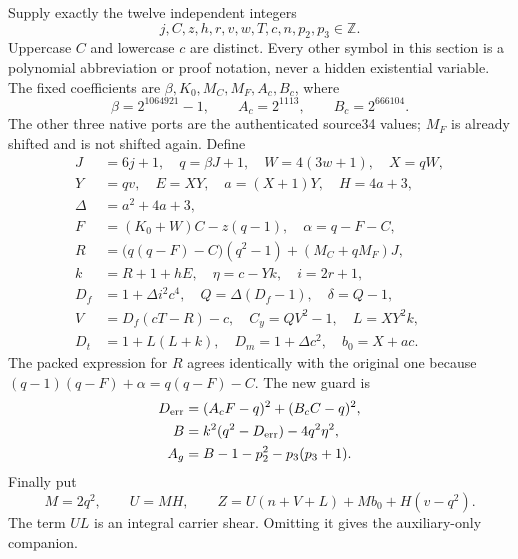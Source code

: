 Supply exactly the twelve independent integers
\[
 j,C,z,h,r,v,w,T,c,n,p_2,p_3\in\mathbb Z.
\]
Uppercase $C$ and lowercase $c$ are distinct.  Every other symbol in this
section is a polynomial abbreviation or proof notation, never a hidden
existential variable.  The fixed coefficients are
$\beta,K_0,M_C,M_F,A_c,B_c$, where
\[
 \beta=2^{1064921}-1,\qquad A_c=2^{1113},\qquad B_c=2^{666104}.
\]
The other three native ports are the authenticated source34 values;
$M_F$ is already shifted and is not shifted again.  Define
\begin{align*}
 J&=6j+1,\quad q=\beta J+1,\quad W=4(3w+1),\quad X=qW,\\
 Y&=qv,\quad E=XY,\quad a=(X+1)Y,\quad H=4a+3,\\
 \Delta&=a^2+4a+3,\\
 F&=(K_0+W)C-z(q-1),\quad \alpha=q-F-C,\\
 R&=\bigl(q(q-F)-C\bigr)(q^2-1)+(M_C+qM_F)J,\\
 k&=R+1+hE,\quad \eta=c-Yk,\quad i=2r+1,\\
 D_f&=1+\Delta i^2c^4,\quad Q=\Delta(D_f-1),\quad \delta=Q-1,\\
 V&=D_f(cT-R)-c,\quad C_y=QV^2-1,\quad L=XY^2k,\\
 D_t&=1+L(L+k),\quad D_m=1+\Delta c^2,\quad b_0=X+ac.
\end{align*}
The packed expression for $R$ agrees identically with the original one
because $(q-1)(q-F)+\alpha=q(q-F)-C$.  The new guard is
\begin{align*}
 D_{\rm err}&=(A_cF-q)^2+(B_cC-q)^2,\\
 B&=k^2(q^2-D_{\rm err})-4q^2\eta^2,\\
 A_g&=B-1-p_2^2-p_3(p_3+1).
\end{align*}
Finally put
\[
 M=2q^2,\qquad U=MH,
 \qquad
 Z=U(n+V+L)+M b_0+H(v-q^2).
\]
The term $UL$ is an integral carrier shear.  Omitting it gives the
auxiliary-only companion.

